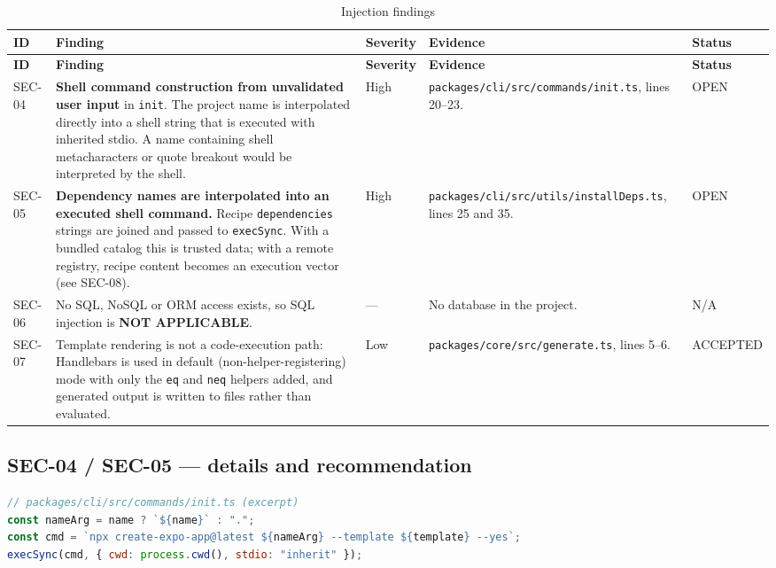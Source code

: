 \begin{longtable}{@{}L{1.3cm}L{3.6cm}L{1.9cm}L{5.8cm}L{1.6cm}@{}}
\caption{Injection findings}\\
\toprule
\textbf{ID} & \textbf{Finding} & \textbf{Severity} & \textbf{Evidence} & \textbf{Status} \\
\midrule
\endfirsthead
\toprule
\textbf{ID} & \textbf{Finding} & \textbf{Severity} & \textbf{Evidence} & \textbf{Status} \\
\midrule
\endhead
SEC-04 & \textbf{Shell command construction from unvalidated user input} in
\texttt{init}. The project name is interpolated directly into a shell string that
is executed with inherited stdio. A name containing shell metacharacters or quote
breakout would be interpreted by the shell. & High &
\texttt{packages/cli/src/commands/init.ts}, lines 20--23. & OPEN \\
SEC-05 & \textbf{Dependency names are interpolated into an executed shell
command.} Recipe \texttt{dependencies} strings are joined and passed to
\texttt{execSync}. With a bundled catalog this is trusted data; with a remote
registry, recipe content becomes an execution vector (see SEC-08). & High &
\texttt{packages/cli/src/utils/installDeps.ts}, lines 25 and 35. & OPEN \\
SEC-06 & No SQL, NoSQL or ORM access exists, so SQL injection is
\textbf{NOT APPLICABLE}. & --- & No database in the project. & N/A \\
SEC-07 & Template rendering is not a code-execution path: Handlebars is used in
default (non-helper-registering) mode with only the \texttt{eq} and \texttt{neq}
helpers added, and generated output is written to files rather than evaluated. & Low &
\texttt{packages/core/src/generate.ts}, lines 5--6. & ACCEPTED \\
\bottomrule
\end{longtable}

\subsection*{SEC-04 / SEC-05 --- details and recommendation}

\begin{lstlisting}[language=JavaScript]
// packages/cli/src/commands/init.ts (excerpt)
const nameArg = name ? `${name}` : ".";
const cmd = `npx create-expo-app@latest ${nameArg} --template ${template} --yes`;
execSync(cmd, { cwd: process.cwd(), stdio: "inherit" });
\end{lstlisting}


